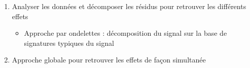\begin{enumerate}
\item Analyser les données et décomposer les résidus pour retrouver les différents effets
\begin{itemize}
\item  Approche par ondelettes : décomposition du signal sur la base de signatures typiques du signal
\end{itemize}
\item Approche globale pour retrouver les effets de façon simultanée
\end{enumerate}

%

